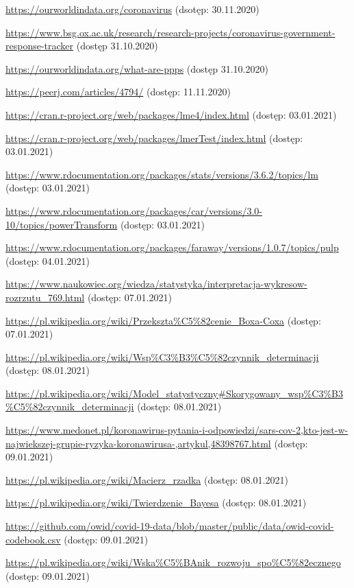 \documentclass[12pt]{mwbk}
\theoremstyle{plain}
\theoremstyle{definition}
\theoremstyle{remark}
\begin{document}
\begin{thebibliography}{99}
 \url{https://ourworldindata.org/coronavirus} (dsotęp: 30.11.2020)

 \url{https://www.bsg.ox.ac.uk/research/research-projects/coronavirus-government-response-tracker} (dostęp 31.10.2020)

 \url{https://ourworldindata.org/what-are-ppps} (dostęp 31.10.2020)





 \url{https://peerj.com/articles/4794/} (dostęp: 11.11.2020)

 \url{https://cran.r-project.org/web/packages/lme4/index.html} (dostęp: 03.01.2021)

 \url{https://cran.r-project.org/web/packages/lmerTest/index.html} (dostęp: 03.01.2021)

 \url{https://www.rdocumentation.org/packages/stats/versions/3.6.2/topics/lm} (dostęp: 03.01.2021)

 \url{https://www.rdocumentation.org/packages/car/versions/3.0-10/topics/powerTransform} (dostęp: 03.01.2021)


 \url{https://www.rdocumentation.org/packages/faraway/versions/1.0.7/topics/pulp} (dostęp: 04.01.2021)



 \url{https://www.naukowiec.org/wiedza/statystyka/interpretacja-wykresow-rozrzutu_769.html} (dostęp: 07.01.2021)



 \url{https://pl.wikipedia.org/wiki/Przekszta\%C5\%82cenie\_Boxa-Coxa} (dostęp: 07.01.2021)

 \url{https://pl.wikipedia.org/wiki/Wsp\%C3\%B3\%C5\%82czynnik\_determinacji} (dostęp: 08.01.2021)

 \url{https://pl.wikipedia.org/wiki/Model\_statystyczny#Skorygowany\_wsp\%C3\%B3\%C5\%82czynnik\_determinacji} (dostęp: 08.01.2021)

 \url{https://www.medonet.pl/koronawirus-pytania-i-odpowiedzi/sars-cov-2,kto-jest-w-najwiekszej-grupie-ryzyka-koronawirusa-,artykul,48398767.html} (dostęp: 09.01.2021)



 \url{https://pl.wikipedia.org/wiki/Macierz_rzadka} (dostęp: 08.01.2021)

 \url{https://pl.wikipedia.org/wiki/Twierdzenie_Bayesa} (dostęp: 08.01.2021)



 \url{https://github.com/owid/covid-19-data/blob/master/public/data/owid-covid-codebook.csv} (dostęp: 09.01.2021)

 \url{https://pl.wikipedia.org/wiki/Wska\%C5\%BAnik\_rozwoju\_spo\%C5\%82ecznego} (dostęp: 09.01.2021)



\end{thebibliography}
\end{document}
